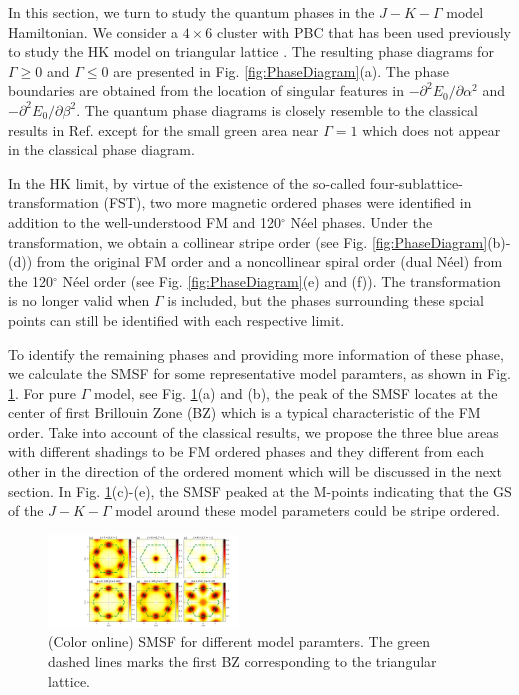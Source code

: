\documentclass[aps,prb,reprint,groupedaddress,showpacs,amsfonts,amsmath,amssymb,superscriptaddress]{revtex4-1}
\begin{document}
In this section, we turn to study the quantum phases in the $J-K-\Gamma$ model Hamiltonian. We consider a $4 \times 6$ cluster with PBC that has been used previously to study the HK model on triangular lattice \cite{KaiLi2015}. The resulting phase diagrams for $\Gamma \geq 0$ and $\Gamma \leq 0$ are presented in Fig. \ref{fig:PhaseDiagram}(a). The phase boundaries are obtained from the location of singular features in $-\partial^2E_0/\partial\alpha^2$ and $-\partial^2E_0/\partial\beta^2$. The quantum phase diagrams is closely resemble to the classical results in Ref.  except for the small green area near $\Gamma=1$ which does not appear in the classical phase diagram.

In the HK limit, by virtue of the existence of the so-called four-sublattice-transformation (FST), two more magnetic ordered phases were identified in addition to the well-understood FM and 120$^\circ$ N\'{e}el phases. Under the transformation, we obtain a collinear stripe order (see Fig. \ref{fig:PhaseDiagram}(b)-(d)) from the original FM order and a noncollinear spiral order (dual N\'{e}el) from the 120$^\circ$ N\'{e}el order (see Fig. \ref{fig:PhaseDiagram}(e) and (f)). The transformation is no longer valid when $\Gamma$ is included, but the phases surrounding these spcial points can still be identified with each respective limit.

To identify the remaining phases and providing more information of these phase, we calculate the SMSF for some representative model paramters, as shown in Fig. \ref{fig:StructureFactors}. For pure $\Gamma$ model, see Fig. \ref{fig:StructureFactors}(a) and (b), the peak of the SMSF locates at the center of first Brillouin Zone (BZ) which is a typical characteristic of the FM order.
Take into account of the classical results, we propose the three blue areas with different shadings to be FM ordered phases and they different from each other in the direction of the ordered moment which will be discussed in the next section. In Fig. \ref{fig:StructureFactors}(c)-(e), the SMSF peaked at the M-points indicating that the GS of the $J-K-\Gamma$ model around these model parameters could be stripe ordered.

\begin{figure}
    \includegraphics[width=0.45\textwidth]{Fig3.pdf}
    \caption{(Color online) SMSF for different model paramters. The green dashed lines marks the first BZ corresponding to the triangular lattice.}
     \label{fig:StructureFactors}
\end{figure}
\end{document}
